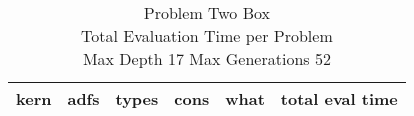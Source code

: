 \begin{table}[H]
\caption{Problem  Two Box \\Total Evaluation Time per Problem \\ Max Depth 17 Max Generations 52\\}
\begin{center}
\scalebox{1.0} %
{
\begin{tabular}{lllllr}
\hline
kern & adfs & types & cons & what & total eval time \\
\hline


\end{tabular}
}
\end{center}
\end{table}

